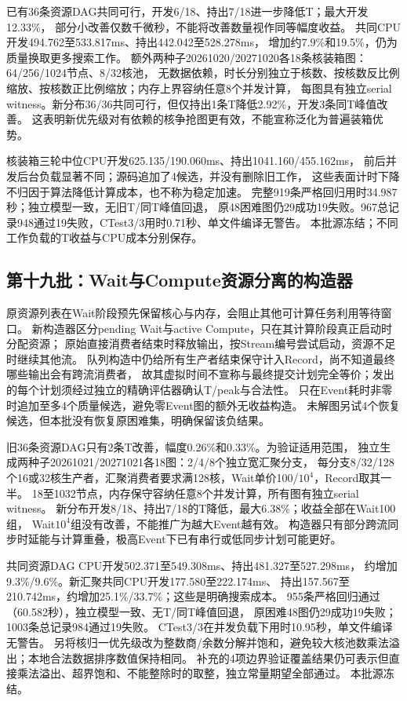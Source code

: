 \documentclass[UTF8,a4paper,11pt,fontset=fandol]{ctexart}
\begin{document}
已有36条资源DAG共同可行，开发6/18、持出7/18进一步降低T；最大开发12.33\%，
部分小改善仅数千微秒，不能将改善数量视作同等幅度收益。
共同CPU开发494.762至533.817ms、持出442.042至528.278ms，
增加约7.9\%和19.5\%，仍为质量换取更多搜索工作。
额外两种子20261020/20271020各18条核装箱图：64/256/1024节点、8/32核池，
无数据依赖，时长分别独立于核数、按核数反比例缩放、按核数正比例缩放；内存上界容纳任意8个并发计算，
每图具有独立serial witness。新分布36/36共同可行，但仅持出1条T降低2.92\%，开发3条同T峰值改善。
这表明新优先级对有依赖的核争抢图更有效，不能宣称泛化为普遍装箱优势。

核装箱三轮中位CPU开发625.135/\allowbreak{}190.060ms、持出1041.160/\allowbreak{}455.162ms，
前后并发后台负载显著不同；源码追加了4候选，并没有删除旧工作，
这些表面计时下降不归因于算法降低计算成本，也不称为稳定加速。
完整919条严格回归用时34.987秒；独立模型一致，无旧T/同T峰值回退，
原48困难图仍29成功19失败。967总记录948通过19失败，CTest3/3用时0.71秒、单文件编译无警告。
本批源冻结；不同工作负载的T收益与CPU成本分别保存。

\subsection{第十九批：Wait与Compute资源分离的构造器}
原资源列表在Wait阶段预先保留核心与内存，会阻止其他可计算任务利用等待窗口。
新构造器区分pending Wait与active Compute，只在其计算阶段真正启动时分配资源；
原始直接消费者结束时释放输出，按Stream编号尝试启动，资源不足时继续其他流。
队列构造中仍给所有生产者结束保守计入Record，尚不知道最终哪些输出会有跨流消费者，
故其虚拟时间不宣称与最终提交计划完全等价；发出的每个计划须经过独立的精确评估器确认T/peak与合法性。
只在Event耗时非零时追加至多4个质量候选，避免零Event图的额外无收益构造。
未解图另试4个恢复候选，但本批没有恢复原困难集，明确保留该负结果。

旧36条资源DAG只有2条T改善，幅度0.26\%和0.33\%。为验证适用范围，
独立生成两种子20261021/20271021各18图：2/4/8个独立宽汇聚分支，
每分支8/32/128个16或32核生产者，汇聚消费者要求满128核，Wait单价100/$10^4$，Record取其一半。
18至1032节点，内存保守容纳任意8个并发计算，所有图有独立serial witness。
新分布开发8/18、持出7/18的T降低，最大6.38\%；收益全部在Wait100组，
Wait$10^4$组没有改善，不能推广为越大Event越有效。
构造器只有部分跨流同步时延能与计算重叠，极高Event下已有串行或低同步计划可能更好。

共同资源DAG CPU开发502.371至549.308ms、持出481.327至527.298ms，
约增加9.3\%/9.6\%。新汇聚共同CPU开发177.580至222.174ms、
持出157.567至210.742ms，约增加25.1\%/33.7\%；这些是明确搜索成本。
955条严格回归通过（60.582秒），独立模型一致、无T/同T峰值回退，
原困难48图仍29成功19失败；1003条总记录984通过19失败。
CTest3/3在并发负载下用时10.95秒，单文件编译无警告。
另将核归一优先级改为整数商/余数分解并饱和，避免较大核池数乘法溢出；本地合法数据排序数值保持相同。
补充的4项边界验证覆盖结果仍可表示但直接乘法溢出、超界饱和、不能整除时的取整，独立常量期望全部通过。
本批源冻结。
\end{document}
